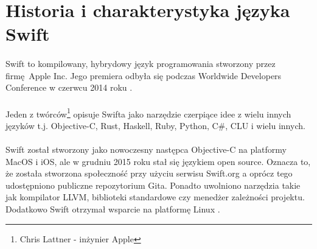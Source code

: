 \documentclass[12pt,oneside,a4paper]{report}
\begin{document}
\section{Historia i charakterystyka języka Swift}
\paragraph{}Swift to kompilowany, hybrydowy język programowania stworzony przez firmę Apple Inc. Jego premiera odbyła się podczas Worldwide Developers Conference w czerwcu 2014 roku  \cite{swiftHistory}. 
\paragraph{}Jeden z twórców\footnote{Chris Lattner - inżynier Apple} opisuje Swifta jako narzędzie czerpiące idee z wielu innych języków t.j. Objective-C, Rust, Haskell, Ruby, Python, C\#, CLU i wielu innych. 
\paragraph{}Swift został stworzony jako nowoczesny następca Objective-C na platformy MacOS i iOS, ale w grudniu 2015 roku stał się językiem open source. Oznacza to, że została stworzona społeczność przy użyciu serwisu Swift.org a oprócz tego udostępniono publiczne repozytorium Gita. Ponadto uwolniono narzędzia takie jak kompilator LLVM, biblioteki standardowe czy menedżer zależności projektu. Dodatkowo Swift otrzymał wsparcie na platformę Linux \cite{swiftOpensource}.
\end{document}
